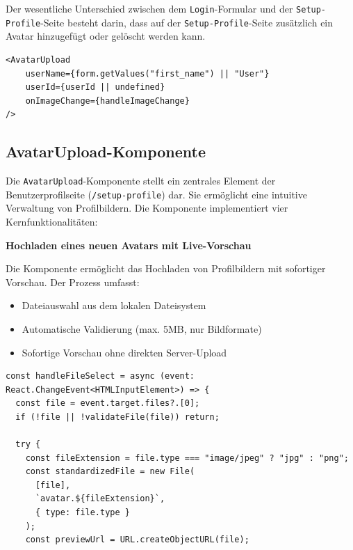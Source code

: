 \begin{inhalt}
Der wesentliche Unterschied zwischen dem \texttt{Login}-Formular und der \texttt{Setup-Profile}-Seite besteht darin, dass auf der \texttt{Setup-Profile}-Seite zusätzlich ein Avatar hinzugefügt oder gelöscht werden kann.

\begin{lstlisting}[style=mytsx]
<AvatarUpload
    userName={form.getValues("first_name") || "User"}
    userId={userId || undefined}
    onImageChange={handleImageChange}
/>
\end{lstlisting}

\newpage

\subsection{AvatarUpload-Komponente}

Die \texttt{AvatarUpload}-Komponente stellt ein zentrales Element der Benutzerprofilseite (\texttt{/setup-profile}) dar. Sie ermöglicht eine intuitive Verwaltung von Profilbildern. Die Komponente implementiert vier Kernfunktionalitäten:

\vspace{0.75cm}

\textbf{Hochladen eines neuen Avatars mit Live-Vorschau}

\vspace{0.15cm}

Die Komponente ermöglicht das Hochladen von Profilbildern mit sofortiger Vorschau. Der Prozess umfasst:
\begin{itemize}
    \item Dateiauswahl aus dem lokalen Dateisystem
    \item Automatische Validierung (max. 5MB, nur Bildformate)
    \item Sofortige Vorschau ohne direkten Server-Upload
\end{itemize}


\begin{lstlisting}[style=mytsx, caption={Implementierung des Avatar-Uploads mit Validierung}, label={lst:avatar_upload}]
const handleFileSelect = async (event: React.ChangeEvent<HTMLInputElement>) => {
  const file = event.target.files?.[0];
  if (!file || !validateFile(file)) return;

  try {
    const fileExtension = file.type === "image/jpeg" ? "jpg" : "png";
    const standardizedFile = new File(
      [file], 
      `avatar.${fileExtension}`, 
      { type: file.type }
    );
    const previewUrl = URL.createObjectURL(file);


\end{lstlisting}
\end{inhalt}
